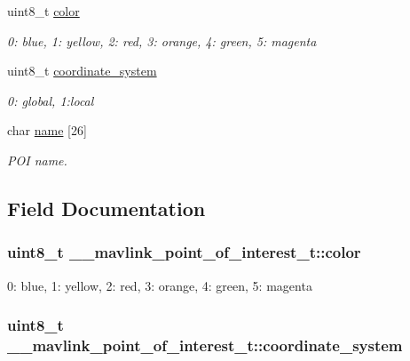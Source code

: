 \begin{DoxyCompactItemize}
uint8\+\_\+t \hyperlink{struct____mavlink__point__of__interest__t_a40d2bd20ed4c2023f3c2a87f1d8b694d}{color}
\begin{DoxyCompactList}\small\item\em 0\+: blue, 1\+: yellow, 2\+: red, 3\+: orange, 4\+: green, 5\+: magenta \end{DoxyCompactList}\item 
uint8\+\_\+t \hyperlink{struct____mavlink__point__of__interest__t_ab1a4cb84e607792a450e546de008a16d}{coordinate\+\_\+system}
\begin{DoxyCompactList}\small\item\em 0\+: global, 1\+:local \end{DoxyCompactList}\item 
char \hyperlink{struct____mavlink__point__of__interest__t_a85b969f50fb77d09f243951890707275}{name} \mbox{[}26\mbox{]}
\begin{DoxyCompactList}\small\item\em P\+O\+I name. \end{DoxyCompactList}\end{DoxyCompactItemize}


\subsection{Field Documentation}
\hypertarget{struct____mavlink__point__of__interest__t_a40d2bd20ed4c2023f3c2a87f1d8b694d}{
\subsubsection[{color}]{\setlength{\rightskip}{0pt plus 5cm}uint8\+\_\+t \+\_\+\+\_\+mavlink\+\_\+point\+\_\+of\+\_\+interest\+\_\+t\+::color}}\label{struct____mavlink__point__of__interest__t_a40d2bd20ed4c2023f3c2a87f1d8b694d}


0\+: blue, 1\+: yellow, 2\+: red, 3\+: orange, 4\+: green, 5\+: magenta 

\hypertarget{struct____mavlink__point__of__interest__t_ab1a4cb84e607792a450e546de008a16d}{
\subsubsection[{coordinate\+\_\+system}]{\setlength{\rightskip}{0pt plus 5cm}uint8\+\_\+t \+\_\+\+\_\+mavlink\+\_\+point\+\_\+of\+\_\+interest\+\_\+t\+::coordinate\+\_\+system}}\label{struct____mavlink__point__of__interest__t_ab1a4cb84e607792a450e546de008a16d}


